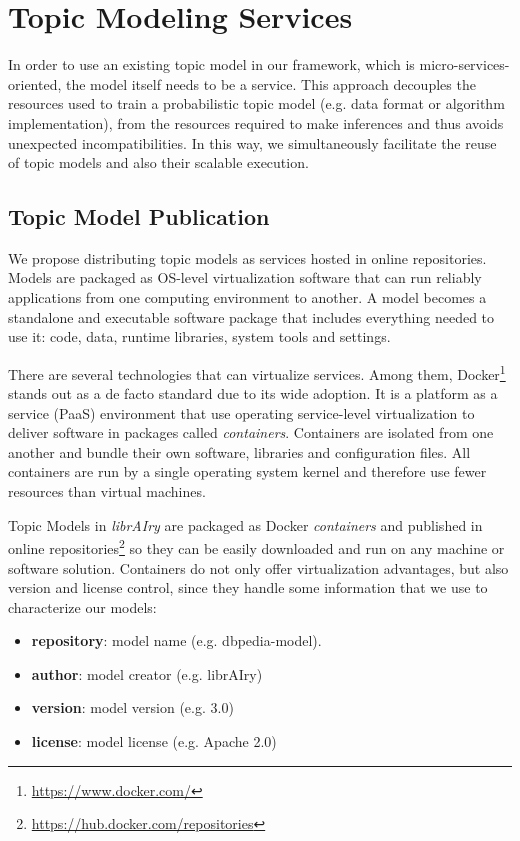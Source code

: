\section{Topic Modeling Services}
\label{sec:reusable-topic-modeling}

In order to use an existing topic model in our framework, which is micro-services-oriented, the model itself needs to be a service. This approach decouples the resources used to train a probabilistic topic model (e.g. data format or algorithm implementation), from the resources required to  make inferences and thus avoids unexpected incompatibilities. In this way, we simultaneously facilitate the reuse of topic models and also their scalable execution.

\subsection{Topic Model Publication}
\label{sec:topic-model-publication}

We propose distributing topic models as services hosted in online repositories. Models are packaged as OS-level virtualization software that can run reliably applications from one computing environment to another. A model becomes a standalone and executable software package that includes everything needed to use it: code, data, runtime libraries, system tools and settings.

There are several technologies that can virtualize services. Among them, Docker\footnote{\url{https://www.docker.com/}} stands out as a de facto standard due to its wide adoption. It is a platform as a service (PaaS) environment that use operating service-level virtualization to deliver software in packages called \textit{containers}. Containers are isolated from one another and bundle their own software, libraries and configuration files. All containers are run by a single operating system kernel and therefore use fewer resources than virtual machines.

Topic Models in \textit{librAIry} are packaged as Docker \textit{containers} and published in online repositories\footnote{\url{https://hub.docker.com/repositories}} so they can be easily downloaded and run on any machine or software solution. Containers do not only offer virtualization advantages, but also version and license control, since they handle some information that we use to characterize our models:
\begin{itemize}
\item \textbf{repository}: model name (e.g. dbpedia-model).
\item \textbf{author}: model creator (e.g. librAIry)
\item \textbf{version}: model version (e.g. 3.0)
\item \textbf{license}: model license (e.g. Apache 2.0)
\end{itemize}


